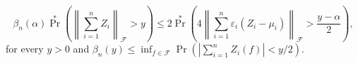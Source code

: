 \begin{remark}
\label{rem--vdvw23-lem--2-3-7}
\begin{equation}
  \beta_{n} (\alpha) \Pr^{\ast} \left( \left\| \sum_{i = 1}^{n} Z_{i}
  \right\|_{\mathcal{F}} > y \right) \leq 2 \Pr^{\ast} \left( 4 \left\| \sum_{i
  = 1}^{n} \varepsilon_{i} \left( Z_{i} - \mu_{i} \right) \right\|_{\mathcal{F}}
  > \frac{y - \alpha}{2}  \right),
  \label{eqn--vdvw23-lem--2-3-7-adj}
\end{equation}
for every \(y > 0\) and \(\beta_{n} (y) \leq \inf_{f \in \mathcal{F}} \Pr \left(
\left| \sum_{i = 1}^{n} Z_{i} (f) \right| < y / 2 \right)\).
\end{remark}


